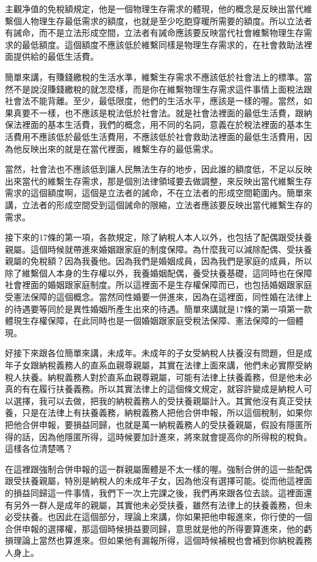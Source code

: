 \documentclass[]{ctexbook}
\begin{document}
主觀净值的免稅額規定，他是一個物理生存需求的體現，他的概念是反映出當代維繫個人物理生存最低需求的額度，也就是至少吃飽穿暖所需要的額度。所以立法者有誡命，而不是立法形成空間，立法者有誡命應該要反映當代社會維繫物理生存需求的最低額度。這個額度不應該低於維繫同樣是物理生存需求的，在社會救助法裡面提供給的最低生活費。

簡單來講，有賺錢繳稅的生活水準，維繫生存需求不應該低於社會法上的標準。當然不是說沒賺錢繳稅的就怎麼樣，而是你在維繫物理生存需求這件事情上面稅法跟社會法不能背離。至少，最低限度，他們的生活水平，應該是一樣的喔。當然，如果真要不一樣，也不應該是稅法低於社會法。就是社會法裡面的最低生活費，跟納保法裡面的基本生活費，我們的概念，用不同的名詞，意義在於稅法裡面的基本生活費用不應該低於最低生活費用，不應該低於社會救助法裡面的最低生活費用，因為他反映出來的就是在當代裡面，維繫生存的最低需求。

當然，社會法也不應該低到讓人民無法生存的地步，因此誰的額度低，不足以反映出來當代的維繫生存需求，那是個別法律領域要去做調整，來反映出當代維繫生存需求的這個額度啊，這個是立法者的誡命，不在立法者的形成空間範圍內。簡單來講，立法者的形成空間受到這個誡命的限縮，立法者應該要反映出當代維繫生存的需求。

接下來的17條的第一項，各款規定，除了納稅人本人以外，也包括了配偶跟受扶養親屬。這個時候就帶進來婚姻跟家庭的制度保障。為什麼我可以減除配偶、受扶養親屬的免稅額？因為我養他。因為我們是婚姻成員，因為我們是家庭的成員，所以除了維繫個人本身的生存權以外，我養婚姻配偶，養受扶養基礎，這同時也在保障社會裡面的婚姻跟家庭制度。所以這裡面不是生存權保障而已，也包括婚姻跟家庭受憲法保障的這個概念。當然同性婚要一併進來，因為在這裡面，同性婚在法律上的待遇要等同於是異性婚姻所產生出來的待遇。簡單來講就是17條的第一項第一款體現生存權保障，在此同時也是一個婚姻跟家庭受稅法保障、憲法保障的一個體現。

好接下來跟各位簡單來講，未成年。未成年的子女受納稅人扶養沒有問題，但是成年子女跟納稅義務人的直系血親尊親屬，其實在法律上面來講，他們未必實際受納稅人扶養。納稅義務人對於直系血親尊親屬，可能有法律上扶養義務，但是他未必真的有在履行扶養義務。所以其實法律上的這個條文規定，就容許變成是納稅人可以選擇，我可以去做，把我的納稅義務人的受扶養親屬計入。其實他沒有真正受扶養，只是在法律上有扶養義務，納稅義務人把他合併申報，所以這個稅制，如果你把他合併申報，要損益同歸，也就是萬一納稅義務人的受扶養親屬，假設有隱匿所得的話，因為他隱匿所得，這時候要加計進來，將來就會提高你的所得稅的稅負。這樣各位清楚嗎？

在這裡跟強制合併申報的這一群親屬團體是不太一樣的喔。強制合併的這一些配偶跟受扶養親屬，特別是納稅人的未成年子女，因為他沒有選擇可能。從而他這裡面的損益同歸這一件事情，我們下一次上完課之後，我們再來跟各位去談。這裡面還有另外一群人是成年的親屬，其實他未必受扶養，雖然有法律上的扶養義務，但未必受扶養。也因此在這個部分，理論上來講，你如果把他申報進來，你行使的一個合併申報的選擇權，那這個時候損益要同歸，意思就是他的所得要算進來，他的虧損理論上當然也算進來。但如果他有漏報所得，這個時候補稅也會補到你納稅義務人身上。
\end{document}
